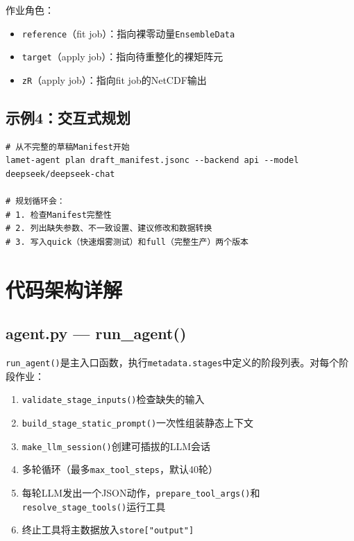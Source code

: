 \documentclass[12pt,a4paper]{ctexart}
\begin{document}
作业角色：
\begin{itemize}[leftmargin=*]
    \item \texttt{reference}（fit job）：指向裸零动量\texttt{EnsembleData}
    \item \texttt{target}（apply job）：指向待重整化的裸矩阵元
    \item \texttt{zR}（apply job）：指向fit job的NetCDF输出
\end{itemize}

\subsection{示例4：交互式规划}

\begin{lstlisting}[caption={交互式规划流程}]
# 从不完整的草稿Manifest开始
lamet-agent plan draft_manifest.jsonc --backend api --model deepseek/deepseek-chat

# 规划循环会：
# 1. 检查Manifest完整性
# 2. 列出缺失参数、不一致设置、建议修改和数据转换
# 3. 写入quick（快速烟雾测试）和full（完整生产）两个版本
\end{lstlisting}

\section{代码架构详解}

\subsection{agent.py — run\_agent()}

\texttt{run\_agent()}是主入口函数，执行\texttt{metadata.stages}中定义的阶段列表。对每个阶段作业：
\begin{enumerate}[leftmargin=*]
    \item \texttt{validate\_stage\_inputs()}检查缺失的输入
    \item \texttt{build\_stage\_static\_prompt()}一次性组装静态上下文
    \item \texttt{make\_llm\_session()}创建可插拔的LLM会话
    \item 多轮循环（最多\texttt{max\_tool\_steps}，默认40轮）
    \item 每轮LLM发出一个JSON动作，\texttt{prepare\_tool\_args()}和\texttt{resolve\_stage\_tools()}运行工具
    \item 终止工具将主数据放入\texttt{store["output"]}
\end{enumerate}
\end{document}
